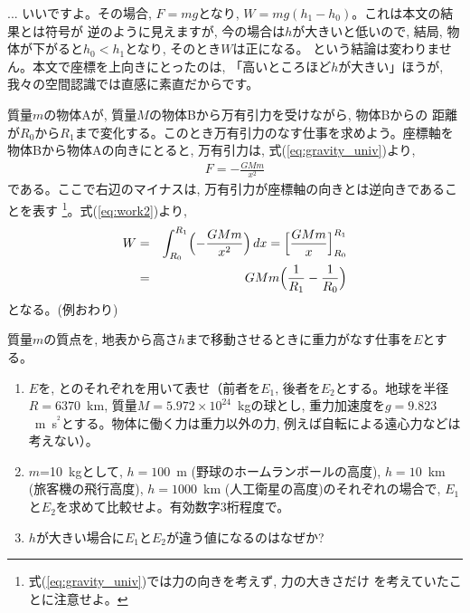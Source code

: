 \begin{faq}{\small{}
... いいですよ。その場合, $F=mg$となり, $W=mg(h_1-h_0)$。これは本文の結果とは符号が
逆のように見えますが, 今の場合は$h$が大きいと低いので, 結局, 物体が下がると$h_0<h_1$となり, 
そのとき$W$は正になる。 という結論は変わりません。本文で座標を上向きにとったのは, 
「高いところほど$h$が大きい」ほうが, 我々の空間認識では直感に素直だからです。}\end{faq}
\mv

\begin{exmpl}
質量$m$の物体Aが, 質量$M$の物体Bから万有引力を受けながら, 物体Bからの
距離が$R_0$から$R_1$まで変化する。このとき万有引力のなす仕事を求めよう。座標軸を
物体Bから物体Aの向きにとると, 万有引力は, 式(\ref{eq:gravity_univ})より, 
\begin{eqnarray}F=-\frac{GMm}{x^2}\end{eqnarray}
である。ここで右辺のマイナスは, 万有引力が座標軸の向きとは逆向きであることを表す
\footnote{式(\ref{eq:gravity_univ})では力の向きを考えず, 力の大きさだけ
を考えていたことに注意せよ。}。式(\ref{eq:work2})より, 
\begin{eqnarray}
W&=&\int_{R_0}^{R_1} \Bigl(-\frac{GMm}{x^2}\Bigr)\,dx=\Bigl[\frac{GMm}{x}\Bigr]_{R_0}^{R_1}\nonumber\\
 &=&GMm\Bigl(\frac{1}{R_1}-\frac{1}{R_0}\Bigr)\label{eq:work_gravity}
\end{eqnarray}
となる。(例おわり)
\end{exmpl}
\mv

\begin{q}\label{q:moveup_work} 質量$m$の質点を, 地表から高さ$h$まで移動させるときに重力がなす仕事を$E$とする。
\begin{enumerate}
\item $E$を, とのそれぞれを用いて表せ（前者を$E_1$, 後者を$E_2$とする。地球を半径$R=6370$~km, 質量$M=5.972\times 10^{24}$~kgの球とし, 重力加速度を$g=9.823$~m~s$^{^2}$とする。物体に働く力は重力以外の力, 例えば自転による遠心力などは考えない）。
\item $m$=10~kgとして, $h=100$~m (野球のホームランボールの高度), $h=10$~km (旅客機の飛行高度), $h=1000$~km (人工衛星の高度)のそれぞれの場合で, $E_1$と$E_2$を求めて比較せよ。有効数字3桁程度で。
\item $h$が大きい場合に$E_1$と$E_2$が違う値になるのはなぜか?
\end{enumerate}
\end{q}
%

